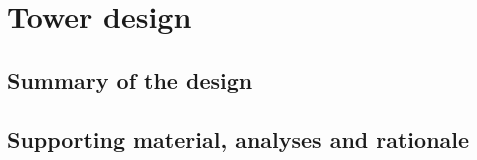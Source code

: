 \section{Tower design}

\subsection{Summary of the design}
\subsection{Supporting material, analyses and rationale}